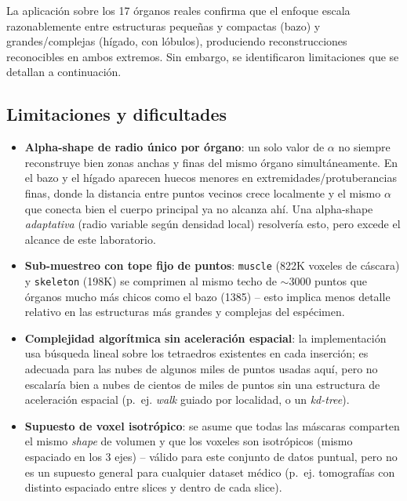 \documentclass[12pt,a4paper]{article}
\begin{document}
La aplicación sobre los 17 órganos reales confirma que el enfoque
escala razonablemente entre estructuras pequeñas y compactas (bazo) y
grandes/complejas (hígado, con lóbulos), produciendo reconstrucciones
reconocibles en ambos extremos. Sin embargo, se identificaron
limitaciones que se detallan a continuación.

\subsection{Limitaciones y dificultades}
\label{sec:limitaciones}

\begin{itemize}
    \item \textbf{Alpha-shape de radio único por órgano}: un solo valor
    de $\alpha$ no siempre reconstruye bien zonas anchas y finas del
    mismo órgano simultáneamente. En el bazo y el hígado aparecen
    huecos menores en extremidades/protuberancias finas, donde la
    distancia entre puntos vecinos crece localmente y el mismo
    $\alpha$ que conecta bien el cuerpo principal ya no alcanza ahí.
    Una alpha-shape \emph{adaptativa} (radio variable según densidad
    local) resolvería esto, pero excede el alcance de este laboratorio.
    \item \textbf{Sub-muestreo con tope fijo de puntos}: \texttt{muscle}
    (822K voxeles de cáscara) y \texttt{skeleton} (198K) se comprimen
    al mismo techo de $\sim$3000 puntos que órganos mucho más chicos
    como el bazo (1385) -- esto implica menos detalle relativo en las
    estructuras más grandes y complejas del espécimen.
    \item \textbf{Complejidad algorítmica sin aceleración espacial}: la
    implementación usa búsqueda lineal sobre los tetraedros existentes
    en cada inserción; es adecuada para las nubes de algunos miles de
    puntos usadas aquí, pero no escalaría bien a nubes de cientos de
    miles de puntos sin una estructura de aceleración espacial
    (p.~ej. \emph{walk} guiado por localidad, o un \emph{kd-tree}).
    \item \textbf{Supuesto de voxel isotrópico}: se asume que todas las
    máscaras comparten el mismo \emph{shape} de volumen y que los
    voxeles son isotrópicos (mismo espaciado en los 3 ejes) -- válido
    para este conjunto de datos puntual, pero no es un supuesto general
    para cualquier dataset médico (p.~ej. tomografías con distinto
    espaciado entre slices y dentro de cada slice).
\end{itemize}
\end{document}

